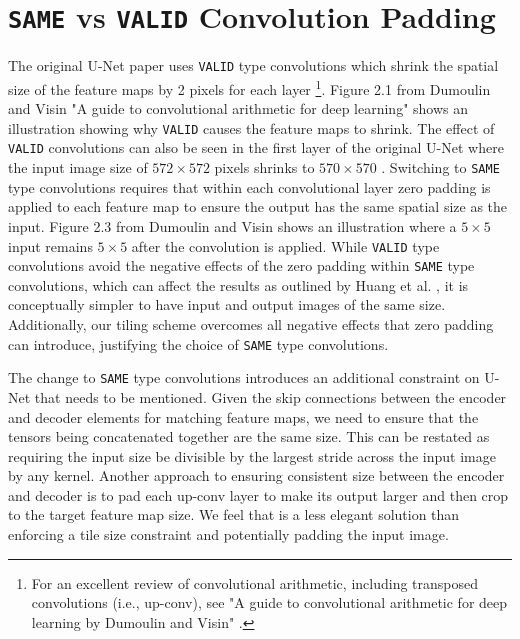 \documentclass[10pt, indentfirst]{article}
\begin{document}
\section{\texttt{SAME}  vs \texttt{VALID} Convolution Padding}

The original U-Net paper uses \texttt{VALID} type convolutions which shrink the spatial size of the feature maps by 2 pixels for each layer \cite{Dumoulin2018}\footnote{For an excellent review of convolutional arithmetic, including transposed convolutions (i.e., up-conv), see "A guide to convolutional arithmetic for deep learning by Dumoulin and Visin" \cite{Dumoulin2018}.}. 
Figure 2.1 from Dumoulin and Visin "A guide to convolutional arithmetic for deep learning" \cite{Dumoulin2018} shows an illustration showing why \texttt{VALID} causes the feature maps to shrink. The effect of \texttt{VALID} convolutions can also be seen in the first layer of the original U-Net where the input image size of $572 \times 572$ pixels shrinks to $570 \times 570$ \cite{Ronneberger2015a}. 
Switching to \texttt{SAME} type convolutions requires that within each convolutional layer zero padding is applied to each feature map to ensure the output has the same spatial size as the input. 
Figure 2.3 from Dumoulin and Visin \cite{Dumoulin2018} shows an illustration where a $ 5 \times 5$ input remains $5 \times 5$ after the convolution is applied. 
While \texttt{VALID} type convolutions avoid the negative effects of the zero padding within \texttt{SAME} type convolutions, which can affect the results as outlined by Huang et al. \cite{Huang2019a}, it is conceptually simpler to have input and output images of the same size. Additionally, our tiling scheme overcomes all negative effects that zero padding can introduce, justifying the choice of \texttt{SAME} type convolutions. 

The change to \texttt{SAME} type convolutions introduces an additional constraint on U-Net that needs to be mentioned. Given the skip connections between the encoder and decoder elements for matching feature maps, we need to ensure that the tensors being concatenated together are the same size. This can be restated as requiring the input size be divisible by the largest stride across the input image by any kernel. Another approach to ensuring consistent size between the encoder and decoder is to pad each up-conv layer to make its output larger and then crop to the target feature map size. We feel that is a less elegant solution than enforcing a tile size constraint and potentially padding the input image. 
\end{document}
